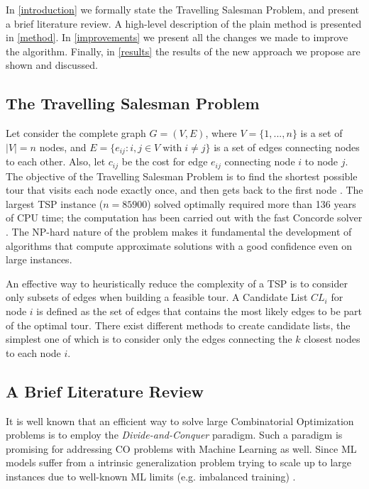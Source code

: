 \documentclass{article}
\begin{document}
In \autoref{introduction} we formally state the Travelling Salesman Problem, and present a brief literature review. A high-level description of the plain method is presented in \autoref{method}. In \autoref{improvements} we present all the changes we made to improve the algorithm. Finally, in \autoref{results} the results of the new approach we propose are shown and discussed.

\subsection{The Travelling Salesman Problem} \label{tsp}

Let consider the complete graph $G = (V, E)$, where $V = \{1, ..., n\}$ is a set of $|V| = n$ nodes, and $E = \{e_{ij} : i,j \in V \; \textrm{with} \; i \neq j\}$ is a set of edges connecting nodes to each other. Also, let $c_{ij}$ be the cost for edge $e_{ij}$ connecting node $i$ to node $j$. The objective of the Travelling Salesman Problem is to find the shortest possible tour that visits each node exactly once, and then gets back to the first node \cite{applegate}.
The largest TSP instance ($n = 85900$) solved optimally required more than 136 years of CPU time; the computation has been carried out with the fast Concorde solver \cite{applegate}. 
The NP-hard nature of the problem makes it fundamental the development of algorithms that compute approximate solutions with a good confidence even on large instances.

\vspace{5 pt}

An effective way to heuristically reduce the complexity of a TSP is to consider only subsets of edges when building a feasible tour. 
A Candidate List $CL_i$ for node $i$ is defined as the set of edges 
that contains the most likely edges to be part of the optimal tour. 
There exist different methods to create candidate lists, the simplest one of which is to consider only the edges connecting the $k$ closest nodes to each node $i$. 

\subsection{A Brief Literature Review} \label{literature-review}
It is well known that an efficient way to solve large Combinatorial Optimization problems is to employ the \emph{Divide-and-Conquer} paradigm.
Such a paradigm is promising for addressing CO problems with Machine Learning as well.
Since ML models suffer from a intrinsic generalization problem trying to scale up to large instances \cite{generalize} due to well-known ML limits (e.g. imbalanced training) \cite{ml_flaws}.
\end{document}
